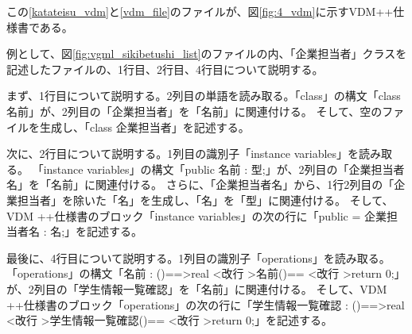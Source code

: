 この\ref{katateisu_vdm}と\ref{vdm_file}のファイルが、図\ref{fig:4_vdm}に示すVDM++仕様書である。

例として、図\ref{fig:vgml_sikibetushi_list}のファイルの内、「企業担当者」クラスを記述したファイルの、1行目、2行目、4行目について説明する。

まず、1行目について説明する。2列目の単語を読み取る。「class」の構文「class 名前」が、2列目の「企業担当者」を「名前」に関連付ける。
そして、空のファイルを生成し、「class 企業担当者」を記述する。

次に、2行目について説明する。1列目の識別子「instance variables」を読み取る。
「instance variables」の構文「public 名前 : 型;」が、2列目の「企業担当者名」を「名前」に関連付ける。
さらに、「企業担当者名」から、1行2列目の「企業担当者」を除いた「名」を生成し、「名」を「型」に関連付ける。
そして、VDM ++仕様書のブロック「instance variables」の次の行に「public  = 企業担当者名 : 名;」を記述する。

最後に、4行目について説明する。1列目の識別子「operations」を読み取る。
「operations」の構文「名前 : ()==\textgreater real \textless 改行 \textgreater 名前()== \textless 改行 \textgreater return 0;」が、2列目の「学生情報一覧確認」を「名前」に関連付ける。
そして、VDM ++仕様書のブロック「operations」の次の行に「学生情報一覧確認 : ()==\textgreater real \textless 改行 \textgreater 学生情報一覧確認()== \textless 改行 \textgreater return 0;」を記述する。
